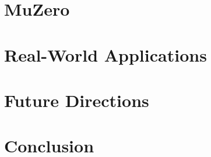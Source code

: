 \documentclass[conference]{IEEEtran}
\begin{document}
\section{MuZero}


\section{Real-World Applications}


\section{Future Directions}


\section*{Conclusion}

\end{document}
